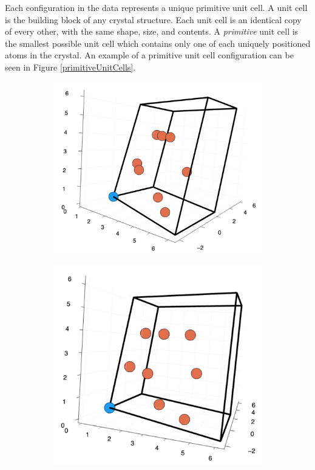 \par Each configuration in the data represents a unique primitive unit cell. A unit cell is the building block of any crystal structure. Each unit cell is an identical copy of every other, with the same shape, size, and contents. A \textit{primitive} unit cell is the smallest possible unit cell which contains only one of each uniquely positioned atoms in the crystal\cite{solidStateBook}. An example of a primitive unit cell configuration can be seen in Figure \ref{primitiveUnitCells}.

\begin{figure}
  \begin{subfigure}{0.25\textwidth}
    \includegraphics[width=\linewidth]{Figures/primitiveCell1}
    \label{primitiveFirst}
  \end{subfigure}%
  \hspace*{\fill}   %
  \begin{subfigure}{0.23\textwidth}
    \includegraphics[width=\linewidth]{Figures/primitiveCell2}

\end{subfigure}
\end{figure}
